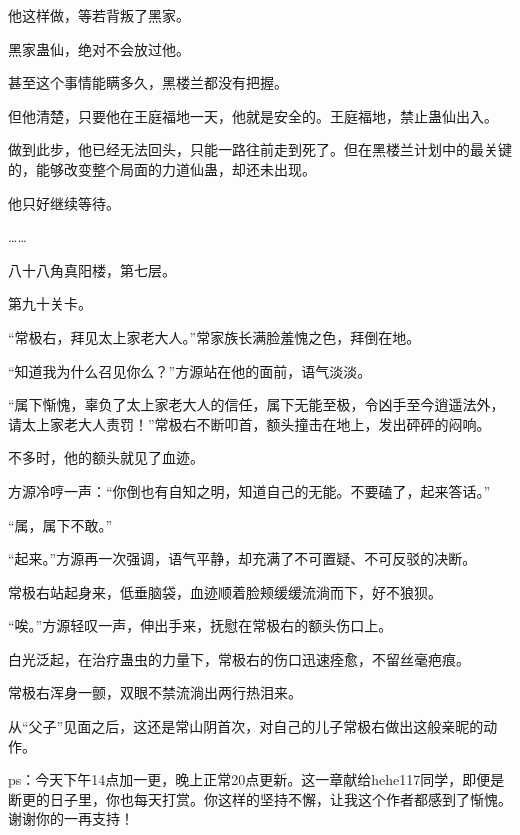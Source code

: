\begin{this_body}
他这样做，等若背叛了黑家。

黑家蛊仙，绝对不会放过他。

甚至这个事情能瞒多久，黑楼兰都没有把握。

但他清楚，只要他在王庭福地一天，他就是安全的。王庭福地，禁止蛊仙出入。

做到此步，他已经无法回头，只能一路往前走到死了。但在黑楼兰计划中的最关键的，能够改变整个局面的力道仙蛊，却还未出现。

他只好继续等待。

……

八十八角真阳楼，第七层。

第九十关卡。

“常极右，拜见太上家老大人。”常家族长满脸羞愧之色，拜倒在地。

“知道我为什么召见你么？”方源站在他的面前，语气淡淡。

“属下惭愧，辜负了太上家老大人的信任，属下无能至极，令凶手至今逍遥法外，请太上家老大人责罚！”常极右不断叩首，额头撞击在地上，发出砰砰的闷响。

不多时，他的额头就见了血迹。

方源冷哼一声：“你倒也有自知之明，知道自己的无能。不要磕了，起来答话。”

“属，属下不敢。”

“起来。”方源再一次强调，语气平静，却充满了不可置疑、不可反驳的决断。

常极右站起身来，低垂脑袋，血迹顺着脸颊缓缓流淌而下，好不狼狈。

“唉。”方源轻叹一声，伸出手来，抚慰在常极右的额头伤口上。

白光泛起，在治疗蛊虫的力量下，常极右的伤口迅速痊愈，不留丝毫疤痕。

常极右浑身一颤，双眼不禁流淌出两行热泪来。

从“父子”见面之后，这还是常山阴首次，对自己的儿子常极右做出这般亲昵的动作。

ps：今天下午14点加一更，晚上正常20点更新。这一章献给hehe117同学，即便是断更的日子里，你也每天打赏。你这样的坚持不懈，让我这个作者都感到了惭愧。谢谢你的一再支持！

\end{this_body}

